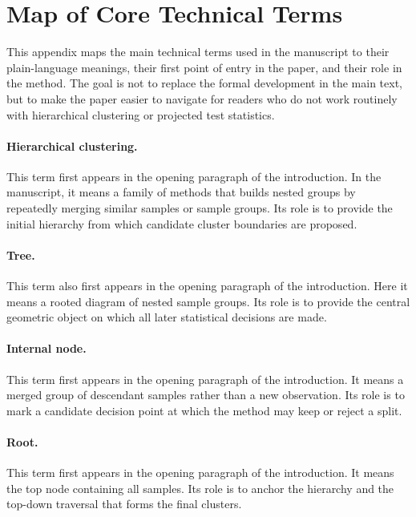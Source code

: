 
\section{Map of Core Technical Terms}
\label{app:jargon-map}

This appendix maps the main technical terms used in the manuscript to their
plain-language meanings, their first point of entry in the paper, and their
role in the method. The goal is not to replace the formal development in the
main text, but to make the paper easier to navigate for readers who do not work
routinely with hierarchical clustering or projected test statistics.

\paragraph{Hierarchical clustering.}
This term first appears in the opening paragraph of the introduction. In the
manuscript, it means a family of methods that builds nested groups by
repeatedly merging similar samples or sample groups. Its role is to provide the
initial hierarchy from which candidate cluster boundaries are proposed.

\paragraph{Tree.}
This term also first appears in the opening paragraph of the introduction. Here
it means a rooted diagram of nested sample groups. Its role is to provide the
central geometric object on which all later statistical decisions are made.

\paragraph{Internal node.}
This term first appears in the opening paragraph of the introduction. It means
a merged group of descendant samples rather than a new observation. Its role is
to mark a candidate decision point at which the method may keep or reject a
split.

\paragraph{Root.}
This term first appears in the opening paragraph of the introduction. It means
the top node containing all samples. Its role is to anchor the hierarchy and
the top-down traversal that forms the final clusters.

